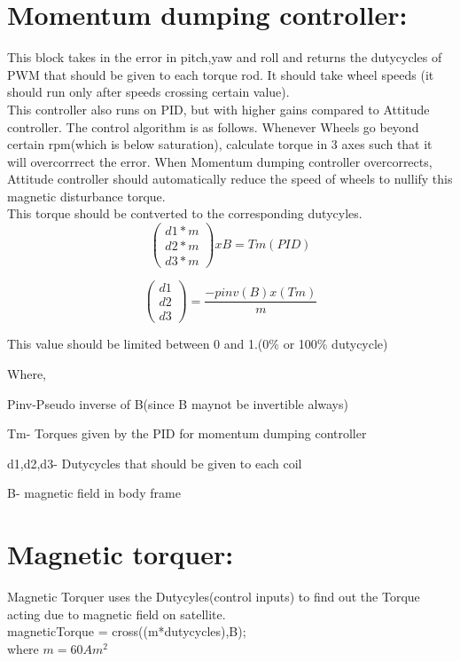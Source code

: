 \documentclass[10pt,a4paper]{report}
\begin{document}
\section{Momentum dumping controller:}
This block takes in the error in pitch,yaw and roll and returns the dutycycles of PWM that should be given to each torque rod. It should take wheel speeds (it should run only after speeds crossing certain value). \\
This controller also runs on PID, but with higher gains compared to Attitude controller. The control algorithm is as follows. Whenever Wheels go beyond certain rpm(which is below saturation), calculate torque in 3 axes such that it will overcorrrect the error. When Momentum dumping controller overcorrects, Attitude controller should automatically reduce the speed of wheels to nullify this magnetic disturbance torque.\\
This torque should be contverted to the corresponding dutycyles.\\
\[
\left(\begin{array}{c}
d1*m\\
d2*m\\
d3*m
\end{array}\right)xB=Tm(PID)
\]

\[
\left(\begin{array}{c}
d1\\
d2\\
d3
\end{array}\right)=\frac{-pinv(B)x(Tm)}{m}
\]

This value should be limited between 0 and 1.(0\% or 100\% dutycycle)

Where,

Pinv-Pseudo inverse of B(since B maynot be invertible always)

Tm- Torques given by the PID for momentum dumping controller

d1,d2,d3- Dutycycles that should be given to each coil

B- magnetic field in body frame

\section{Magnetic torquer:}
Magnetic Torquer uses the Dutycyles(control inputs) to find out the Torque acting due to magnetic field on satellite.\\
magneticTorque = cross((m*dutycycles),B);\\
where $m=60Am^2$\\
\end{document}
